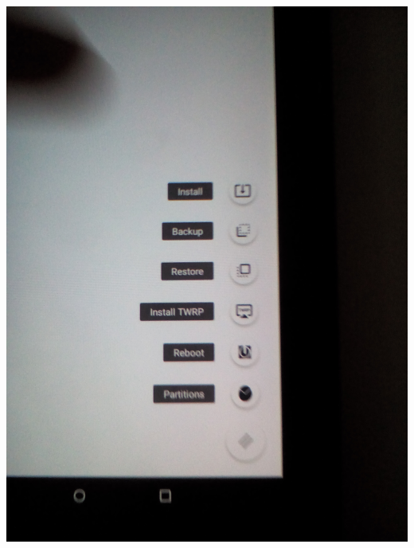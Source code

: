 \documentclass[11pt,a4paper]{article}
\begin{document}
\includegraphics[scale=0.09]{./Image/img11} \\ \\ \\
\end{document}
